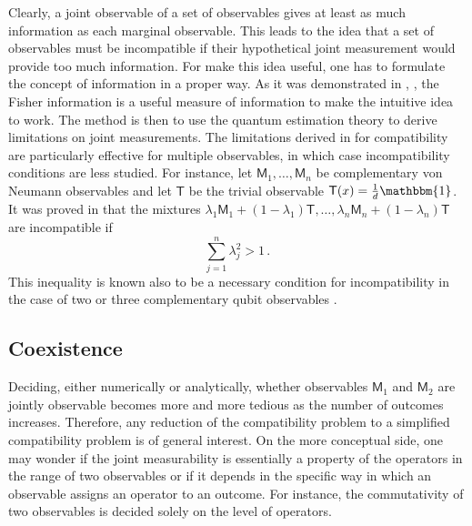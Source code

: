 \documentclass[12pt]{iopart}
\theoremstyle{definition}
\newcommand{\id}{\mathbbm{1}} %
\newcommand{\Mo}{\mathsf{M}}%
\newcommand{\To}{\mathsf{T}}%
\begin{document}
Clearly, a joint observable of a set of observables gives at least as much information as each marginal observable. 
This leads to the idea that a set of observables must be incompatible if their hypothetical joint measurement would provide too much information. 
For make this idea useful, one has to formulate the concept of information in a proper way. 
As it was demonstrated in \cite{WaSaUe11}, \cite{Zhu15}, the Fisher information is a useful measure of information to make the intuitive idea to work. 
The method is then to use the quantum estimation theory to derive limitations on joint measurements.
 The limitations derived in \cite{Zhu15} for compatibility are particularly effective for multiple observables, in which case incompatibility conditions are less studied. For instance, let $\Mo_1, \ldots,\Mo_n$ be complementary von Neumann observables and let $\To$ be the trivial observable $\To(x)=\frac{1}{d} \id$.  It was proved in \cite{Zhu15} that the mixtures $\lambda_1 \Mo_1 + (1-\lambda_1) \To,\ldots,\lambda_n \Mo_n + (1-\lambda_n) \To$ are incompatible if
\begin{equation}
\sum_{j=1}^n \lambda_j^2  > 1 \, .
\end{equation}
This inequality is known also to be a necessary condition for incompatibility in the case of two or three complementary qubit observables \cite{Busch86}. 


\subsection{Coexistence}

Deciding, either numerically or analytically,  
whether observables $\Mo_1$ and $\Mo_2$ are
jointly observable becomes more and more tedious as the number of 
outcomes increases. Therefore, any reduction of the
compatibility problem to a simplified compatibility problem 
is of general interest. 
On the more conceptual side, one may wonder if the joint measurability is essentially a property of the operators in the range of two observables or if it depends in the specific way in which an observable assigns an operator to an outcome. For instance, the commutativity of two observables is decided solely on the level of operators. 
\end{document}
